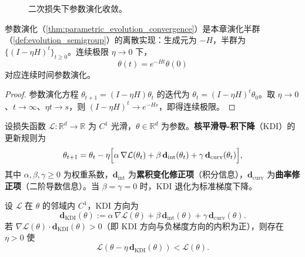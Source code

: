 \begin{figure}[htbp]
\centering
{}
\caption{二次损失下参数演化收敛。}
\label{fig:parametric_convergence}
\end{figure}

\begin{corollary}[参数演化作为线性演化半群的离散实现]\label{cor:parametric_as_semigroup}
参数演化（\cref{thm:parametric_evolution_convergence}）是本章演化半群（\cref{def:evolution_semigroup}）的离散实现：生成元为 $-H$，半群为 $\{(I-\eta H)^t\}_{t\ge 0}$。连续极限 $\eta\to 0$ 下，
\[
\theta(t) = e^{-Ht}\theta(0)
\]
对应连续时间参数演化。
\end{corollary}

\begin{proof}
参数演化方程 $\theta_{t+1} = (I-\eta H)\theta_t$ 的迭代为 $\theta_t = (I-\eta H)^t\theta_0$。取 $\eta\to 0$、$t\to\infty$、$\eta t\to s$，则 $(I-\eta H)^t\to e^{-Hs}$，即得连续极限。
\end{proof}

\begin{definition}\label{def:kdi_definition}
设损失函数 $\mathcal{L}:\mathbb{R}^d\to\mathbb{R}$ 为 $C^1$ 光滑，$\theta\in\mathbb{R}^d$ 为参数。\textbf{核平滑导-积下降}（KDI）的更新规则为
\[
\theta_{t+1} = \theta_t - \eta\Bigl[\alpha\,\nabla\mathcal{L}(\theta_t) + \beta\,\mathbf{d}_{\text{int}}(\theta_t) + \gamma\,\mathbf{d}_{\text{curv}}(\theta_t)\Bigr],
\]
其中 $\alpha,\beta,\gamma\ge 0$ 为权重系数，$\mathbf{d}_{\text{int}}$ 为\textbf{累积变化修正项}（积分信息），$\mathbf{d}_{\text{curv}}$ 为\textbf{曲率修正项}（二阶导数信息）。当 $\beta=\gamma=0$ 时，KDI 退化为标准梯度下降。
\end{definition}

\begin{proposition}\label{prop:kdi_descent}
设 $\mathcal{L}$ 在 $\theta$ 的邻域内 $C^1$，KDI 方向为
\[
\mathbf{d}_{\text{KDI}}(\theta) := \alpha\,\nabla\mathcal{L}(\theta) + \beta\,\mathbf{d}_{\text{int}}(\theta) + \gamma\,\mathbf{d}_{\text{curv}}(\theta).
\]
若 $\nabla\mathcal{L}(\theta)\cdot\mathbf{d}_{\text{KDI}}(\theta) > 0$（即 KDI 方向与负梯度方向的内积为正），则存在 $\eta>0$ 使
\[
\mathcal{L}(\theta - \eta\,\mathbf{d}_{\text{KDI}}(\theta)) < \mathcal{L}(\theta).
\]
\end{proposition}

